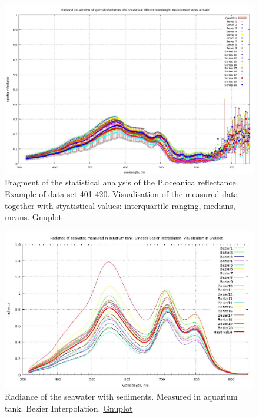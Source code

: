 \documentclass[10pt, a4paper]{article}
\begin{document}
\begin{appendices}
\begin{figure}[h]
	\begin{center}
	\includegraphics[scale=0.20]{GNU-Stat-M-401-420.jpg}
	\caption{Fragment of the statistical analysis of the P.oceanica reflectance. Example of data set 401-420. 
		Visualisation of the measured data together with styatistical values: interquartile ranging, medians, means. \href{http://www.gnuplot.info/}{Gnuplot}}
	\label{fig:46}
	\end{center}
\end{figure}

\begin{figure}[H]
	\centering
	\includegraphics[scale=0.25]{GNU-Radiance_Bezier.jpg}
	\caption{Radiance of the seawater with sediments. Measured in aquarium tank. Bezier Interpolation. \href{http://www.gnuplot.info/}{Gnuplot}}
	\label{fig:47}
\end{figure}


\end{appendices}
\end{document}
